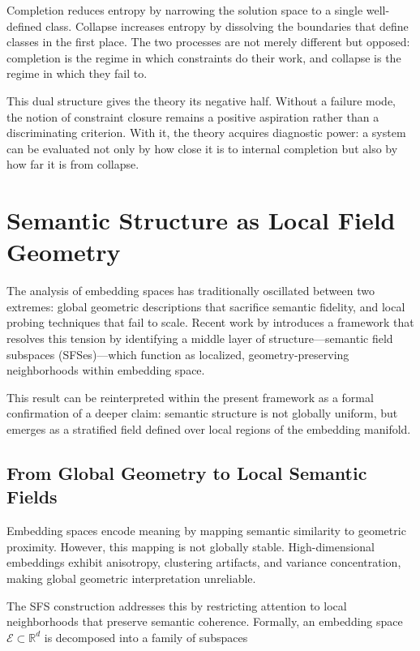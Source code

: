 \documentclass[11pt, twoside]{article}
\theoremstyle{plain}
\theoremstyle{definition}
\theoremstyle{remark}
\begin{document}
Completion reduces entropy by narrowing the solution space to a single well-defined class. Collapse increases entropy by dissolving the boundaries that define classes in the first place. The two processes are not merely different but opposed: completion is the regime in which constraints do their work, and collapse is the regime in which they fail to.

This dual structure gives the theory its negative half. Without a failure mode, the notion of constraint closure remains a positive aspiration rather than a discriminating criterion. With it, the theory acquires diagnostic power: a system can be evaluated not only by how close it is to internal completion but also by how far it is from collapse.

\section{Semantic Structure as Local Field Geometry}
\label{sec:semantic_fields}

The analysis of embedding spaces has traditionally oscillated between two extremes: global geometric descriptions that sacrifice semantic fidelity, and local probing techniques that fail to scale. Recent work by \cite{sun2025swallow} introduces a framework that resolves this tension by identifying a middle layer of structure---semantic field subspaces (SFSes)---which function as localized, geometry-preserving neighborhoods within embedding space.

This result can be reinterpreted within the present framework as a formal confirmation of a deeper claim: semantic structure is not globally uniform, but emerges as a stratified field defined over local regions of the embedding manifold.

\subsection{From Global Geometry to Local Semantic Fields}

Embedding spaces encode meaning by mapping semantic similarity to geometric proximity. However, this mapping is not globally stable. High-dimensional embeddings exhibit anisotropy, clustering artifacts, and variance concentration, making global geometric interpretation unreliable.

The SFS construction addresses this by restricting attention to local neighborhoods that preserve semantic coherence. Formally, an embedding space $\mathcal{E} \subset \mathbb{R}^d$ is decomposed into a family of subspaces
\end{document}
